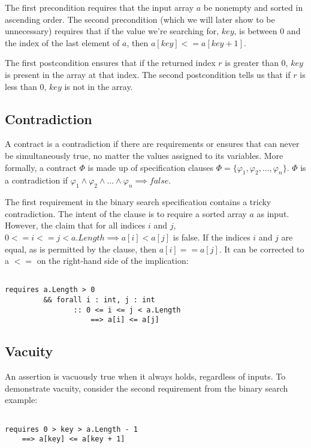 \documentclass[sigplan,screen,anonymous]{acmart}
\begin{document}
The first precondition requires that the input array \(a\) be nonempty and sorted in ascending order. The second precondition (which we will later show to be unnecessary) requires that if the value we're searching for, \(key\), is between 0 and the index of the last element of \(a\), then \(a[key] <= a[key + 1]\).

The first postcondition ensures that if the returned index \(r\) is greater than 0, \(key\) is present in the array at that index. The second postcondition tells us that if \(r\) is less than 0, \(key\) is not in the array.

\subsection{Contradiction}

A contract is a contradiction if there are requirements or ensures that can never be simultaneously true, no matter the values assigned to its variables. More formally, a contract \(\Phi\) is made up of specification clauses \(\Phi = \{\varphi_{1}, \varphi_{2}, ..., \varphi_{n}\}\). \(\Phi\) is a contradiction if \(\varphi_{1} \land \varphi_{2} \land ... \land \varphi_{n} \implies false\).

The first requirement in the binary search specification contains a tricky contradiction. The intent of the clause is to require a sorted array \(a\) as input. However, the claim that for all indices \(i\) and \(j\), \(0 <= i <= j < a.Length \implies a[i] < a[j]\) is false. If the indices \(i\) and \(j\) are equal, as is permitted by the clause, then \(a[i] == a[j]\). It can be corrected to a \(<=\) on the right-hand side of the implication:

\begin{lstlisting}[language=dafny]

requires a.Length > 0
         && forall i : int, j : int
                :: 0 <= i <= j < a.Length
                    ==> a[i] <= a[j]

\end{lstlisting}

\subsection{Vacuity}

An assertion is vacuously true when it always holds, regardless of inputs. To demonstrate vacuity, consider the second requirement from the binary search example:

\begin{lstlisting}[language=dafny]

requires 0 > key > a.Length - 1
    ==> a[key] <= a[key + 1]

\end{lstlisting}
\end{document}
